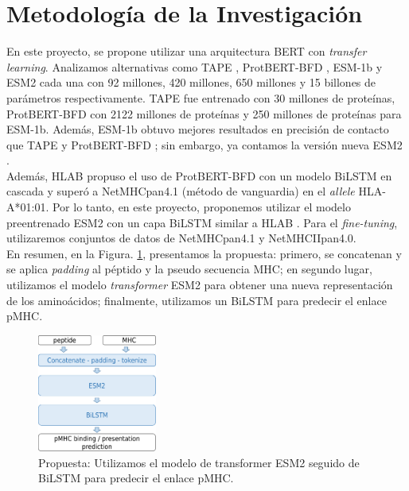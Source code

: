 \documentclass[a4paper]{article}
\begin{document}
\section{Metodología de la Investigación} 

En este proyecto, se propone utilizar una arquitectura BERT con \textit{transfer learning}. Analizamos alternativas como TAPE \citep{rao2019evaluating}, ProtBERT-BFD \citep{elnaggar2021prottrans}, ESM-1b \citep{rives2021biological} y ESM2 \citep{lin2023evolutionary} cada una con 92 millones, 420 millones, 650 millones y 15 billones de parámetros respectivamente. TAPE fue entrenado con 30 millones de proteínas, ProtBERT-BFD con 2122 millones de proteínas y 250 millones de proteínas para ESM-1b. Además, ESM-1b obtuvo mejores resultados en precisión de contacto que TAPE y ProtBERT-BFD \citep{rives2021biological}; sin embargo, ya contamos la versión nueva ESM2 \citep{lin2023evolutionary}.\\

Además, HLAB \citep{zhang2022hlab} propuso el uso de ProtBERT-BFD \citep{elnaggar2021prottrans} con un modelo BiLSTM en cascada y superó a NetMHCpan4.1 (método de vanguardia) en el \textit{allele} HLA-A*01:01. Por lo tanto, en este proyecto, proponemos utilizar el modelo preentrenado ESM2 \citep{lin2023evolutionary} con un capa BiLSTM  similar a HLAB \citep{zhang2022hlab}. Para el \textit{fine-tuning}, utilizaremos conjuntos de datos de NetMHCpan4.1 y NetMHCIIpan4.0.\\

En resumen, en la Figura. \ref{fig:proposal}, presentamos la propuesta: primero, se concatenan y se aplica \textit{padding} al péptido y la pseudo secuencia MHC; en segundo lugar, utilizamos el modelo \textit{transformer} ESM2 para obtener una nueva representación de los aminoácidos; finalmente, utilizamos un BiLSTM para predecir el enlace pMHC. 





\begin{figure}[H]
	\centering
	\includegraphics[width=0.35\textwidth]{img/neoantigen/proposal1}
	\caption{Propuesta: Utilizamos el modelo de transformer ESM2 seguido de BiLSTM para predecir el enlace pMHC.}
	\label{fig:proposal}
\end{figure}
\end{document}
